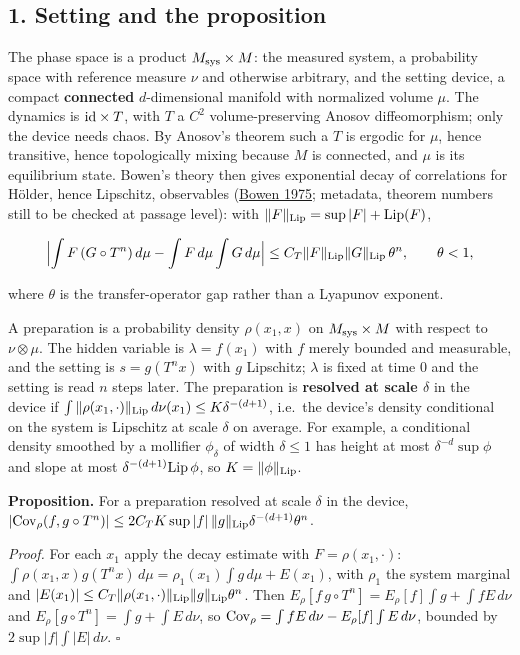 \documentclass[11pt,a4paper]{article}
\begin{document}
\hypertarget{setting-and-the-proposition}{%
\subsection{1. Setting and the
proposition}\label{setting-and-the-proposition}}

The phase space is a product \(M_{\rm sys}\times M\): the measured
system, a probability space with reference measure \(\nu\) and otherwise
arbitrary, and the setting device, a compact \textbf{connected}
\(d\)-dimensional manifold with normalized volume \(\mu\). The dynamics
is \({\rm id}\times T\), with \(T\) a \(C^2\) volume-preserving Anosov
diffeomorphism; only the device needs chaos. By Anosov's theorem such a
\(T\) is ergodic for \(\mu\), hence transitive, hence topologically
mixing because \(M\) is connected, and \(\mu\) is its equilibrium state.
Bowen's theory then gives exponential decay of correlations for Hölder,
hence Lipschitz, observables
(\href{https://doi.org/10.1007/BFb0081279}{Bowen 1975}; metadata,
theorem numbers still to be checked at passage level): with
\(\|F\|_{\rm Lip}=\sup|F|+{\rm Lip}(F)\),

\[\Bigl|\int F\,(G\circ T^n)\,d\mu-\int F\,d\mu\int G\,d\mu\Bigr|\le C_T\|F\|_{\rm Lip}\|G\|_{\rm Lip}\,\theta^n,\qquad\theta<1,\]

where \(\theta\) is the transfer-operator gap rather than a Lyapunov
exponent.

A preparation is a probability density \(\rho(x_1,x)\) on
\(M_{\rm sys}\times M\) with respect to \(\nu\otimes\mu\). The hidden
variable is \(\lambda=f(x_1)\) with \(f\) merely bounded and measurable,
and the setting is \(s=g(T^nx)\) with \(g\) Lipschitz; \(\lambda\) is
fixed at time 0 and the setting is read \(n\) steps later. The
preparation is \textbf{resolved at scale \(\delta\)} in the device if
\(\int\|\rho(x_1,\cdot)\|_{\rm Lip}\,d\nu(x_1)\le K\delta^{-(d+1)}\),
i.e.~the device's density conditional on the system is Lipschitz at
scale \(\delta\) on average. For example, a conditional density smoothed
by a mollifier \(\phi_\delta\) of width \(\delta\le1\) has height at
most \(\delta^{-d}\sup\phi\) and slope at most
\(\delta^{-(d+1)}{\rm Lip}\,\phi\), so \(K=\|\phi\|_{\rm Lip}\).

\textbf{Proposition.} For a preparation resolved at scale \(\delta\) in
the device,
\(|{\rm Cov}_\rho(f,g\circ T^n)|\le2C_TK\sup|f|\,\|g\|_{\rm Lip}\delta^{-(d+1)}\theta^n\).

\emph{Proof.} For each \(x_1\) apply the decay estimate with
\(F=\rho(x_1,\cdot)\):
\(\int\rho(x_1,x)g(T^nx)\,d\mu=\rho_1(x_1)\int g\,d\mu+E(x_1)\), with
\(\rho_1\) the system marginal and
\(|E(x_1)|\le C_T\|\rho(x_1,\cdot)\|_{\rm Lip}\|g\|_{\rm Lip}\theta^n\).
Then \(E_\rho[f\,g\circ T^n]=E_\rho[f]\int g+\int fE\,d\nu\) and
\(E_\rho[g\circ T^n]=\int g+\int E\,d\nu\), so
\({\rm Cov}_\rho=\int fE\,d\nu-E_\rho[f]\int E\,d\nu\), bounded by
\(2\sup|f|\int|E|\,d\nu\). \(\square\)
\end{document}
